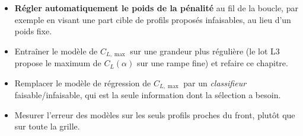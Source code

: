 \begin{pistes}
\begin{itemize}
\item \textbf{Régler automatiquement le poids de la pénalité} au fil de la boucle, par exemple en visant une part cible de profils proposés infaisables, au lieu d'un poids fixe.
\item Entraîner le modèle de $C_{L,\max}$ sur une grandeur plus régulière (le lot L3 propose le maximum de $C_L(\alpha)$ sur une rampe fine) et refaire ce chapitre.
\item Remplacer le modèle de régression de $C_{L,\max}$ par un \emph{classifieur} faisable/infaisable, qui est la seule information dont la sélection a besoin.
\item Mesurer l'erreur des modèles sur les seuls profils proches du front, plutôt que sur toute la grille.
\end{itemize}
\end{pistes}
